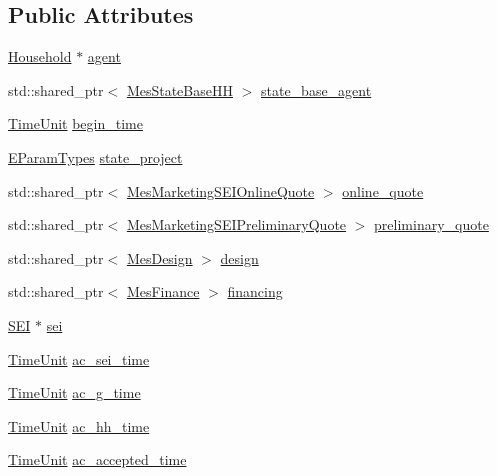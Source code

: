 \subsection*{Public Attributes}
\begin{DoxyCompactItemize}
\item 
\hyperlink{classsolar__core_1_1_household}{Household} $\ast$ \hyperlink{classsolar__core_1_1_p_v_project_a20e8115154979d2f856f1acceb6bb2b1}{agent}
\item 
std\+::shared\+\_\+ptr$<$ \hyperlink{classsolar__core_1_1_mes_state_base_h_h}{Mes\+State\+Base\+H\+H} $>$ \hyperlink{classsolar__core_1_1_p_v_project_a1a3576ddac7b82f9a2d7c139af9850d2}{state\+\_\+base\+\_\+agent}
\item 
\hyperlink{namespacesolar__core_a4b5949d07259da6f8a20d12a30403e90}{Time\+Unit} \hyperlink{classsolar__core_1_1_p_v_project_a5b8869c2a2580e5183a7796580074555}{begin\+\_\+time}
\item 
\hyperlink{namespacesolar__core_aa1147341e5ef7a40d68d1bd68e149362}{E\+Param\+Types} \hyperlink{classsolar__core_1_1_p_v_project_ab25a22c1202f2314a55dc9a759922183}{state\+\_\+project}
\item 
std\+::shared\+\_\+ptr$<$ \hyperlink{classsolar__core_1_1_mes_marketing_s_e_i_online_quote}{Mes\+Marketing\+S\+E\+I\+Online\+Quote} $>$ \hyperlink{classsolar__core_1_1_p_v_project_ae7998ae898c0230fbde18818cfd088a1}{online\+\_\+quote}
\item 
std\+::shared\+\_\+ptr$<$ \hyperlink{classsolar__core_1_1_mes_marketing_s_e_i_preliminary_quote}{Mes\+Marketing\+S\+E\+I\+Preliminary\+Quote} $>$ \hyperlink{classsolar__core_1_1_p_v_project_a5d75e9dfe664f7307b0dc24c1f00d8a9}{preliminary\+\_\+quote}
\item 
std\+::shared\+\_\+ptr$<$ \hyperlink{classsolar__core_1_1_mes_design}{Mes\+Design} $>$ \hyperlink{classsolar__core_1_1_p_v_project_a0e3e8228c8129ccd07e44503ef8577a8}{design}
\item 
std\+::shared\+\_\+ptr$<$ \hyperlink{classsolar__core_1_1_mes_finance}{Mes\+Finance} $>$ \hyperlink{classsolar__core_1_1_p_v_project_adf809769d8d38859f2f766fb5332b946}{financing}
\item 
\hyperlink{classsolar__core_1_1_s_e_i}{S\+E\+I} $\ast$ \hyperlink{classsolar__core_1_1_p_v_project_af8fdd82137a3b0aa277ae6b9663fcb33}{sei}
\item 
\hyperlink{namespacesolar__core_a4b5949d07259da6f8a20d12a30403e90}{Time\+Unit} \hyperlink{classsolar__core_1_1_p_v_project_a0a78a4b527a897aac39e5572fbb5a842}{ac\+\_\+sei\+\_\+time}
\item 
\hyperlink{namespacesolar__core_a4b5949d07259da6f8a20d12a30403e90}{Time\+Unit} \hyperlink{classsolar__core_1_1_p_v_project_a9be23309024672b4be445f68c73e42a6}{ac\+\_\+g\+\_\+time}
\item 
\hyperlink{namespacesolar__core_a4b5949d07259da6f8a20d12a30403e90}{Time\+Unit} \hyperlink{classsolar__core_1_1_p_v_project_ab6196935ca6f777b28a944642efdbf84}{ac\+\_\+hh\+\_\+time}
\item 
\hyperlink{namespacesolar__core_a4b5949d07259da6f8a20d12a30403e90}{Time\+Unit} \hyperlink{classsolar__core_1_1_p_v_project_a1affdb487e749b689fe2bcbd9c79613c}{ac\+\_\+accepted\+\_\+time}
\end{DoxyCompactItemize}


